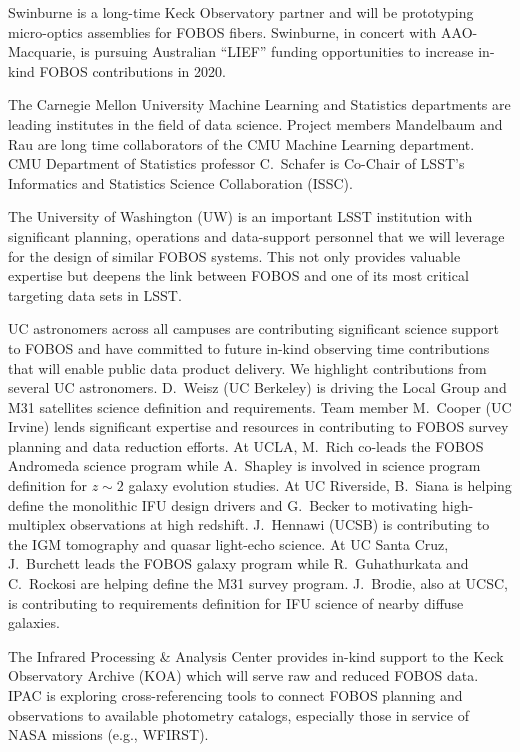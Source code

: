 \documentclass[oneside,11pt]{amsart}
\begin{document}
 Swinburne is a long-time
Keck Observatory partner and will be prototyping micro-optics
assemblies for FOBOS fibers. Swinburne, in concert with
AAO-Macquarie, is pursuing Australian ``LIEF'' funding opportunities
to increase in-kind FOBOS contributions in 2020.

 The Carnegie Mellon
University Machine Learning and Statistics departments are leading
institutes in the field of data science. Project members Mandelbaum
and Rau are long time collaborators of the CMU Machine Learning
department. CMU Department of Statistics professor C.~Schafer is
Co-Chair of LSST's Informatics and Statistics Science Collaboration
(ISSC).

 The University of
Washington (UW) is an important LSST institution with significant
planning, operations and data-support personnel that we will leverage
for the design of similar FOBOS systems. This not only provides
valuable expertise but deepens the link between FOBOS and one of its
most critical targeting data sets in LSST.

 UC astronomers across all campuses
are contributing significant science support to FOBOS and have
committed to future in-kind observing time contributions that will
enable public data product delivery. We highlight contributions from
several UC astronomers. D.~Weisz (UC Berkeley) is driving the Local
Group and M31 satellites science definition and requirements. Team
member M.~Cooper (UC Irvine) lends significant expertise and
resources in contributing to FOBOS survey planning and data reduction
efforts. At UCLA, M.~Rich co-leads the FOBOS Andromeda science
program while A.~Shapley is involved in science program definition
for $z \sim 2$ galaxy evolution studies. At UC Riverside, B.~Siana is
helping define the monolithic IFU design drivers and G.~Becker to
motivating high-multiplex observations at high redshift. J.~Hennawi
(UCSB) is contributing to the IGM tomography and quasar light-echo
science. At UC Santa Cruz, J.~Burchett leads the FOBOS galaxy program
while R.~Guhathurkata and C.~Rockosi are helping define the M31
survey program. J.~Brodie, also at UCSC, is contributing to
requirements definition for IFU science of nearby diffuse galaxies.

 The Infrared Processing \& Analysis Center
provides in-kind support to the Keck Observatory Archive (KOA) which
will serve raw and reduced FOBOS data. IPAC is exploring
cross-referencing tools to connect FOBOS planning and observations to
available photometry catalogs, especially those in service of NASA
missions (e.g., WFIRST).
\end{document}
